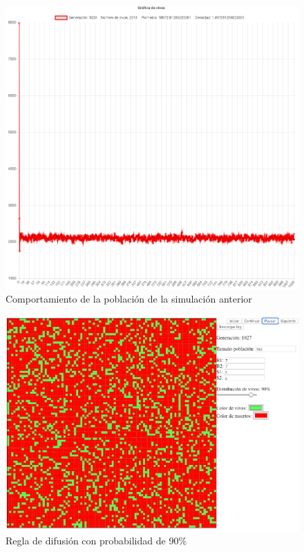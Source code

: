 	\begin{figure}[H]
		\begin{center}
			\includegraphics[scale=.24]{GOL/img/dif80-2.png}
			\caption{Comportamiento de la población de la simulación anterior}
			\label{fig:gol5}
		\end{center}
	\end{figure}

	\begin{figure}[H]
		\begin{center}
			\includegraphics[scale=.3]{GOL/img/dif90-1.png}
			\caption{Regla de difusión con probabilidad de 90\%}
			\label{fig:gol5}
		\end{center}
	\end{figure}

